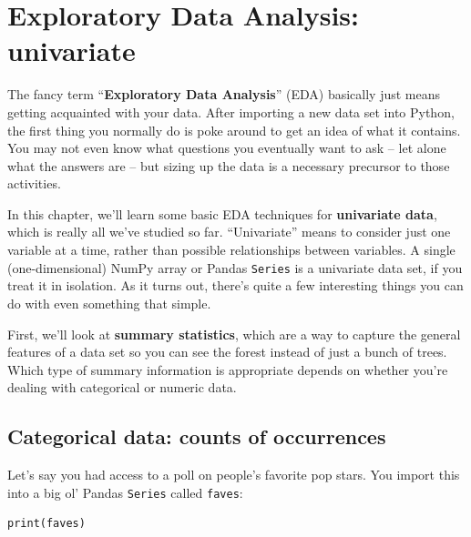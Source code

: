 
\chapter[EDA: univariate]{Exploratory Data Analysis: univariate}
\label{ch:edaUnivariate}


The fancy term ``\textbf{Exploratory Data Analysis}'' (EDA) basically just
means getting acquainted with your data. After importing a new data set into
Python, the first thing you normally do is poke around to get an idea of what
it contains. You may not even know what questions you eventually want to ask --
let alone what the answers are -- but sizing up the data is a necessary
precursor to those activities.


In this chapter, we'll learn some basic EDA techniques for \textbf{univariate
data}, which is really all we've studied so far. ``Univariate'' means to
consider just one variable at a time, rather than possible relationships
between variables. A single (one-dimensional) NumPy array or Pandas
\texttt{Series} is a univariate data set, if you treat it in isolation. As it
turns out, there's quite a few interesting things you can do with even
something that simple.



First, we'll look at \textbf{summary statistics}, which are a way to capture
the general features of a data set so you can see the forest instead of just a
bunch of trees. Which type of summary information is appropriate depends on
whether you're dealing with categorical or numeric data.

\section[Categorical: counts of occurrences]{Categorical data: counts of occurrences}

\label{categoricalDataValueCounts}


Let's say you had access to a poll on people's favorite pop stars. You import
this into a big ol' Pandas \texttt{Series} called \texttt{faves}:

\begin{Verbatim}[fontsize=\scriptsize,samepage=true,frame=single,framesep=3mm]
print(faves)
\end{Verbatim}

